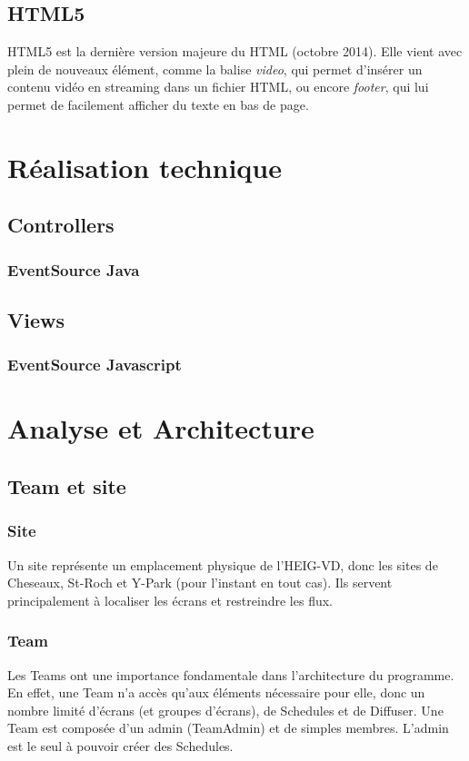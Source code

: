 \documentclass[french]{article}
\begin{document}
\subsection{HTML5}
HTML5 est la dernière version majeure du HTML (octobre 2014). Elle vient avec plein de nouveaux élément, comme la balise \textit{video}, qui permet d'insérer un contenu vidéo en streaming dans un fichier HTML, ou encore \textit{footer}, qui lui permet de facilement afficher du texte en bas de page.

\section{Réalisation technique}

\subsection{Controllers}

\subsubsection{EventSource Java}

\subsection{Views}

\subsubsection{EventSource Javascript}

\newpage
\section{Analyse et Architecture}

\subsection{Team et site}

\subsubsection{Site}
Un site représente un emplacement physique de l'HEIG-VD, donc les sites de Cheseaux, St-Roch et Y-Park (pour l'instant en tout cas). Ils servent principalement à localiser les écrans et restreindre les flux. 

\subsubsection{Team}
Les Teams ont une importance fondamentale dans l'architecture du programme. En effet, une Team n'a accès qu'aux éléments nécessaire pour elle, donc un nombre limité d'écrans (et groupes d'écrans), de Schedules et de Diffuser. Une Team est composée d'un admin (TeamAdmin) et de simples membres. L'admin est le seul à pouvoir créer des Schedules.
\end{document}
